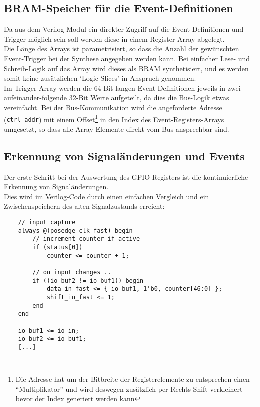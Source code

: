 {\subsection{BRAM-Speicher für die Event-Definitionen}

Da aus dem Verilog-Modul ein direkter Zugriff auf die Event-Definitionen und -Trigger möglich sein soll werden diese in einem Register-Array abgelegt.\\
Die Länge des Arrays ist parametrisiert, so dass die Anzahl der gewünschten Event-Trigger bei der Synthese angegeben werden kann. Bei einfacher Lese- und Schreib-Logik auf das Array wird dieses als BRAM synthetisiert, und es werden somit keine zusätzlichen `Logic Slices' in Anspruch genommen.\\  
Im Trigger-Array werden die 64 Bit langen Event-Definitionen jeweils in zwei aufeinander-folgende 32-Bit Werte aufgeteilt, da dies die Bus-Logik etwas vereinfacht.  
Bei der Bus-Kommunikation wird die angeforderte Adresse ({\tt ctrl\_addr}) mit einem Offset\footnote{Die Adresse hat um der Bitbreite der Registerelemente zu entsprechen einen ``Multiplikator'' und wird deswegen zusätzlich per Rechts-Shift verkleinert bevor der Index generiert werden kann} in den Index des Event-Registers-Arrays umgesetzt, so dass alle Array-Elemente direkt vom Bus ansprechbar sind. 

\subsection{Erkennung von Signaländerungen und Events}

Der erste Schritt bei der Auswertung des GPIO-Registers ist die kontinuierliche Erkennung von Signaländerungen.\\
Dies wird im Verilog-Code durch einen einfachen Vergleich und ein Zwischenspeichern des alten Signalzustands erreicht:

\begin{verbatim}
	// input capture
	always @(posedge clk_fast) begin
		// increment counter if active
		if (status[0])  
			counter <= counter + 1;
		
		// on input changes ..
		if ((io_buf2 != io_buf1)) begin
			data_in_fast <= { io_buf1, 1'b0, counter[46:0] };
			shift_in_fast <= 1;
		end
	end
	
	io_buf1 <= io_in;
	io_buf2 <= io_buf1;	
	[...]


\end{verbatim}}
